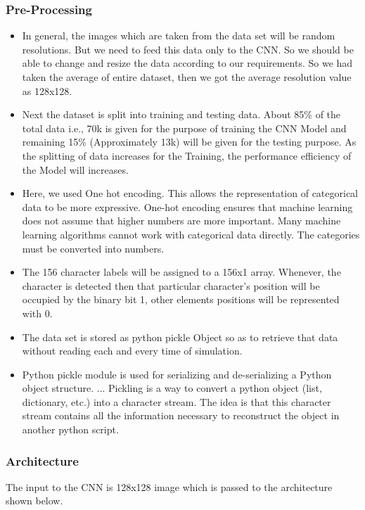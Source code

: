 \documentclass[12pt,a4paper]{article}
\begin{document}
\subsubsection{Pre-Processing}


\begin{itemize}
    \item In general, the images which are taken from the data set will be random resolutions. But we need to feed this data only to the CNN. So we should be able to change and resize the data according to our requirements. So we had taken the average of entire dataset, then we got the average resolution value as 128x128.
    \item Next the dataset is split into training and testing data. About 85\% of the total data i.e., 70k is given for the purpose of training the CNN Model and remaining 15\% (Approximately 13k) will be given for the testing purpose. As the splitting of data increases for the Training, the performance efficiency of the Model will increases.
    \item Here, we used One hot encoding. This allows the representation of categorical data to be more expressive. One-hot encoding ensures that machine learning does not assume that higher numbers are more important. Many machine learning algorithms cannot work with categorical data directly. The categories must be converted into numbers.
    \item The 156 character labels will be assigned to a 156x1 array. Whenever, the character is detected then that particular character’s position will be occupied by the binary bit 1, other elements positions will be represented with 0.
    \item The data set is stored as python pickle Object so as to retrieve that data without reading each and every time of simulation.
    \item Python pickle module is used for serializing and de-serializing a Python object structure. ... Pickling is a way to convert a python object (list, dictionary, etc.) into a character stream. The idea is that this character stream contains all the information necessary to reconstruct the object in another python script.
\end{itemize}

\subsubsection{Architecture}

\quad \quad The input to the CNN is 128x128 image which is passed to the architecture shown below.
\end{document}
